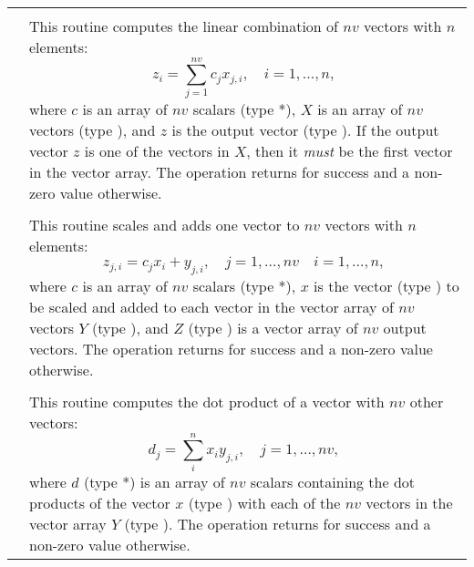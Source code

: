 \label{t:nvecfusedops}
\tablelasttail{\hline}
\begin{xtabular}{|p{\coloneb}|p{\coltwob}|}

 &  \\ 
& This routine computes the linear combination of $nv$ vectors with $n$
elements:
\begin{equation*}
z_i = \sum_{j=1}^{nv} c_j x_{j,i}, \quad i=1,\ldots,n,
\end{equation*}
where $c$ is an array of $nv$ scalars (type *), $X$ is an array of
$nv$ vectors (type ), and $z$ is the output vector (type
). If the output vector $z$ is one of the vectors in $X$, then it
\textit{must} be the first vector in the vector array. The operation returns
 for success and a non-zero value otherwise.
\\[2mm]

 &  \\ 
& This routine scales and adds one vector to $nv$ vectors with $n$ elements:
\begin{equation*}
z_{j,i} = c_j x_i + y_{j,i}, \quad j=1,\ldots,nv \quad i=1,\ldots,n,
\end{equation*}
where $c$ is an array of $nv$ scalars (type *), $x$ is the vector
(type ) to be scaled and added to each vector in the vector array
of $nv$ vectors $Y$ (type ), and $Z$ (type ) is a
vector array of $nv$ output vectors. The operation returns  for success and a
non-zero value otherwise.
\\[2mm]

 &  \\ 
& This routine computes the dot product of a vector with $nv$ other vectors:
\begin{equation*}
d_j = \sum_{i}^{n} x_i y_{j,i}, \quad j=1,\ldots,nv,
\end{equation*}
where $d$ (type *) is an array of $nv$ scalars containing the
dot products of the vector $x$ (type ) with each of the $nv$
vectors in the vector array $Y$ (type ). The operation returns
 for success and a non-zero value otherwise.
\\[2mm]

\end{xtabular}
\bigskip

